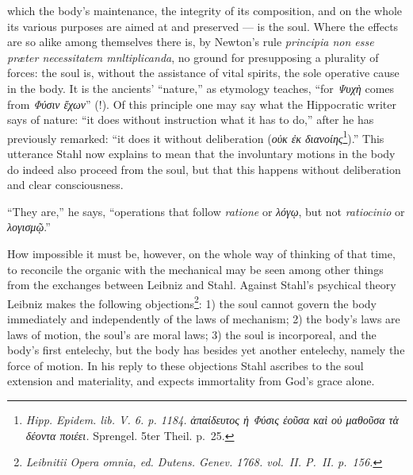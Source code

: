\documentclass[12pt,a4paper]{book}
\begin{document}
which the body's maintenance, the integrity of its composition, and on the
whole its various purposes are aimed at and preserved --- is the soul. Where
the effects are so alike among themselves there is, by Newton's rule
\textit{principia non esse præter necessitatem mnltiplicanda}, no ground for
presupposing a plurality of forces: the soul is, without the assistance of
vital spirits, the sole operative cause in the body. It is the ancients'
``nature,'' as etymology teaches, ``for \textit{Ψυχὴ} comes from
\textit{Φύσιν ἔχων}'' (!). Of this principle one may say what the Hippocratic
writer says of nature: ``it does without instruction what it has to do,'' after
he has previously remarked: ``it does it without deliberation
(\textit{οὐκ ἐκ διανοίης}\footnote{\textit{Hipp. Epidem. lib. V. 6.
p. 1184.} \textit{ἀπαίδευτος ἡ Φύσις ἐοῦσα καὶ οὐ μαθοῦσα τὰ δέοντα
ποιέει.} Sprengel. 5ter Theil. p.~25.}).'' This utterance Stahl now explains to
mean that the involuntary motions in the body do indeed also proceed from the
soul,
but that this happens without deliberation and clear consciousness.

\setcounter{footnote}{0}
``They are,'' he says, ``operations that follow \textit{ratione} or
\textit{λόγῳ}, but not \textit{ratiocinio} or \textit{λογισμῷ}.''

How impossible it must be, however, on the whole way of thinking of that time,
to reconcile the organic with the mechanical may be seen among other things
from the exchanges between Leibniz and Stahl. Against Stahl's psychical theory
Leibniz makes the following
objections\footnote{\textit{Leibnitii Opera omnia, ed. Dutens.
Genev. 1768. vol.\ II. P.\ II. p.\ 156.}}: 1) the soul cannot govern the body
immediately and independently of the laws of mechanism; 2) the body's laws are
laws of motion, the soul's are moral laws; 3) the soul is incorporeal, and the
body's first entelechy, but the body has besides yet another entelechy, namely
the force of motion. In his reply to these objections Stahl ascribes to the
soul extension and materiality, and expects immortality from God's grace alone.
\end{document}

